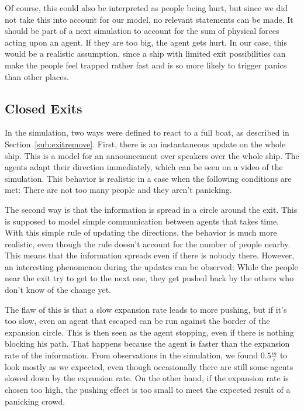 \documentclass[11pt]{article}
\begin{document}
Of course, this could also be interpreted as people being hurt, but since
we did not take this into account for our model, no relevant statements can
be made. It should be part of a next simulation to account for the sum of 
physical forces acting upon an agent. If they are too big, the agent gets hurt.
In our case, this would be a realistic assumption, since a ship with limited
exit possibilities can make the people feel trapped rather fast and is so more
likely to trigger panics than other places.



\FloatBarrier %
\subsection{Closed Exits} %
\label{sub:Closed exits}

In the simulation, two ways were defined to react to a full boat, as described
in Section~\ref{sub:exitremove}.  First, there is an instantaneous update on
the whole ship.  This is a model for an announcement over speakers over the
whole ship.  The agents adapt their direction immediately, which can be seen on
a video of the simulation.  This behavior is realistic in a case when the
following conditions are met: There are not too many people and they aren't
panicking.

The second way is that the information is spread in a circle around the exit.
This is supposed to model simple communication between agents that takes time.
With this simple rule of updating the directions, the behavior is much more
realistic, even though the rule doesn't account for the number of people
nearby.  This means that the information spreads even if there is nobody there.
However, an interesting phenomenon during the updates can be observed:  While
the people near the exit try to get to the next one, they get pushed back by
the others who don't know of the change yet.

The flaw of this is that a slow expansion rate leads to more pushing, but if
it's too slow, even an agent that escaped can be run against the border of the
expansion circle.  This is then seen as the agent stopping, even if there is
nothing blocking his path. That happens because the agent is faster than the
expansion rate of the information. From observations in the simulation, we
found \(0.5\frac{m}{s}\) to look mostly as we expected, even though
occasionally there are still some agents slowed down by the expansion rate.  On
the other hand, if the expansion rate is chosen too high, the pushing effect is
too small to meet the expected result of a panicking crowd.
\end{document}
